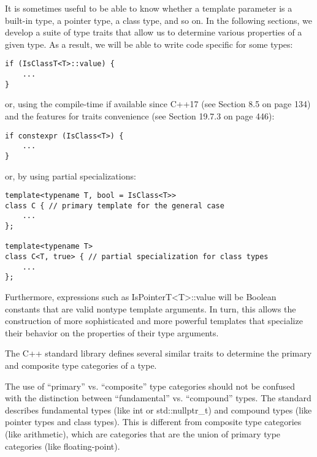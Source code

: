 
It is sometimes useful to be able to know whether a template parameter is a built-in type, a pointer type, a class type, and so on. In the following sections, we develop a suite of type traits that allow us to determine various properties of a given type. As a result, we will be able to write code specific for some types:

\begin{lstlisting}[style=styleCXX]
if (IsClassT<T>::value) {
	...
}
\end{lstlisting}

or, using the compile-time if available since C++17 (see Section 8.5 on page 134) and the features for traits convenience (see Section 19.7.3 on page 446):

\begin{lstlisting}[style=styleCXX]
if constexpr (IsClass<T>) {
	...
}
\end{lstlisting}

or, by using partial specializations:

\begin{lstlisting}[style=styleCXX]
template<typename T, bool = IsClass<T>>
class C { // primary template for the general case
	...
};

template<typename T>
class C<T, true> { // partial specialization for class types
	...
};
\end{lstlisting}

Furthermore, expressions such as IsPointerT<T>::value will be Boolean constants that are valid nontype template arguments. In turn, this allows the construction of more sophisticated and more powerful templates that specialize their behavior on the properties of their type arguments.

The C++ standard library defines several similar traits to determine the primary and composite type categories of a type.

\begin{tcolorbox}[colback=webgreen!5!white,colframe=webgreen!75!black]
\hspace*{0.75cm}The use of “primary” vs. “composite” type categories should not be confused with the distinction between “fundamental” vs. “compound” types. The standard describes fundamental types (like int or std::nullptr\_t) and compound types (like pointer types and class types). This is different from composite type categories (like arithmetic), which are categories that are the union of primary type categories (like floating-point).
\end{tcolorbox}

